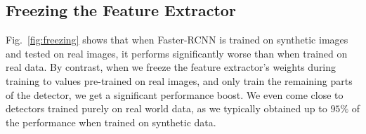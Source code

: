 \documentclass[10pt,twocolumn,letterpaper]{article}
\newcommand{\stefan}[1]{{\color{DarkRed}#1}}
\newcommand{\asus}[0]{AsusXtionPROLive\xspace}
\begin{document}
\subsection{Freezing the Feature Extractor}
\label{subsec:freezing}

Fig.~\ref{fig:freezing}  shows that  when  Faster-RCNN is  trained on  synthetic
images and  tested on  real images,  it performs  significantly worse  than when
trained  on real  data.  By contrast,  when we  freeze  the feature  extractor's
weights during training to values pre-trained on real images, and only train the
remaining parts  of the detector,  we get  a significant performance  boost.  We
even come close to detectors trained purely  on real world data, as we typically
obtained up to $95\%$ of the performance when trained on synthetic data.



\end{document}
